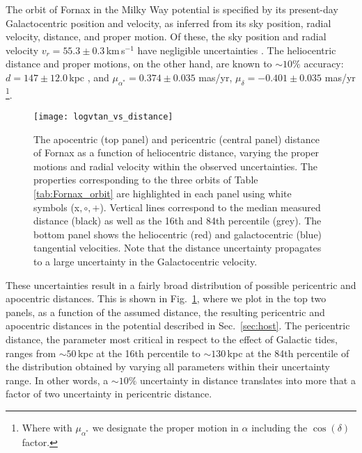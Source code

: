 \documentclass[fleqn,usenatbib]{mnras}
\begin{document}
The orbit of Fornax in the Milky Way potential is specified by its present-day Galactocentric position and velocity, as inferred from its sky position, radial velocity, distance, and proper motion. Of these, the sky position and radial velocity $v_r = 55.3 \pm 0.3$\,km\,s$^{-1}$ have negligible uncertainties \citep[see; e.g.,][]{Fritz2018} . The heliocentric distance and proper motions, on the other hand, are known to $\sim 10\%$ accuracy: $d = 147 \pm 12.0$\,kpc \citep{Pietrzynski2009}, and $\mu_{\alpha^*} = 0.374 \pm 0.035$ mas/yr, $\mu_\delta = -0.401 \pm 0.035$ mas/yr \citep{Fritz2018}\footnote{Where with $\mu_{\alpha^*}$ we designate the proper motion in $\alpha$ including the $\cos(\delta)$ factor.}.

\begin{figure}
	\texttt{[image: logvtan\_vs\_distance]}
        \caption{The apocentric (top panel) and pericentric (central panel) distance of Fornax as a function of heliocentric distance, varying the proper motions and radial velocity within the observed uncertainties. The properties corresponding to the three orbits of Table \ref{tab:Fornax_orbit} are highlighted in each panel using white symbols (x$,\circ,+$). Vertical lines correspond to the median measured distance (black) as well as the 16th and 84th percentile (grey).  The bottom panel shows the heliocentric (red) and galactocentric (blue) tangential velocities. Note that the distance uncertainty propagates to a large uncertainty in the Galactocentric velocity. }
    \label{fig:tangential_velocity}
  \end{figure}

These uncertainties result in a fairly broad distribution of possible pericentric and apocentric distances. This is shown in Fig.~\ref{fig:tangential_velocity}, where we plot in the top two panels, as a function of the assumed distance, the resulting pericentric and apocentric distances in the potential described in Sec.~\ref{sec:host}. The pericentric distance, the parameter most critical in respect to the effect of Galactic tides, ranges from $\sim 50$\,kpc at the 16th percentile to $\sim 130$\,kpc at the 84th percentile of the distribution obtained by varying all parameters within their uncertainty range. In other words, a $\sim 10\%$ uncertainty in distance translates into more that a factor of two uncertainty in pericentric distance. 
\end{document}
